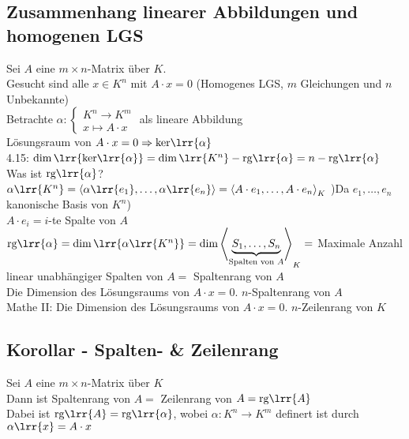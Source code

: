 \subsection{Zusammenhang linearer Abbildungen und homogenen LGS}
	Sei $A$ eine $m\times n$-Matrix über $K$.\\
	Gesucht sind alle $x\in K^n$ mit $A\cdot x=0$ (Homogenes LGS, $m$ Gleichungen und $n$ Unbekannte)\\
	Betrachte $\alpha:\begin{cases}K^n\rightarrow K^m\\x\mapsto A\cdot x\end{cases}$ als lineare Abbildung\\
	Lösungsraum von $A\cdot x=0 \Rightarrow \mbox{ker}\lrr{\alpha}$\\
	4.15: $\dim\lrr{\mbox{ker}\lrr{\alpha}}=\dim\lrr{K^n}-\mbox{rg}\lrr{\alpha}=n-\mbox{rg}\lrr{\alpha}$\\
	Was ist $\mbox{rg}\lrr{\alpha}$?\\
	$\alpha\lrr{K^n}=\left\langle\alpha\lrr{e_1},\dots,\alpha\lrr{e_n}\right\rangle=\left\langle A\cdot e_1,\dots, A\cdot e_n\right\rangle_K$ )Da $e_1,\dots,e_n$ kanonische Basis von $K^n$)\\
	$A\cdot e_i=i$-te Spalte von $A$\\
	$\mbox{rg}\lrr{\alpha}=\dim\lrr{\alpha\lrr{K^n}}=\dim\left\langle \underbrace{S_1,\dots,S_n}_{\mbox{\scriptsize Spalten von }\scriptstyle A}\right\rangle_K=$ Maximale Anzahl linear unabhängiger Spalten von $A =$ Spaltenrang von $A$\\
	Die Dimension des Lösungsraums von $A\cdot x=0$. $n$-Spaltenrang von $A$\\
	Mathe II: Die Dimension des Lösungsraums von $A\cdot x=0$. $n$-Zeilenrang von $K$
	
\subsection{Korollar - Spalten- \& Zeilenrang}
	Sei $A$ eine $m\times n$-Matrix über $K$\\
	Dann ist Spaltenrang von $A =$ Zeilenrang von $A=\mbox{rg}\lrr{A}$\\
	Dabei ist $\mbox{rg}\lrr{A}=\mbox{rg}\lrr{\alpha}$, wobei $\alpha:K^n\rightarrow K^m$ definert ist durch $\alpha\lrr{x}=A\cdot x$

